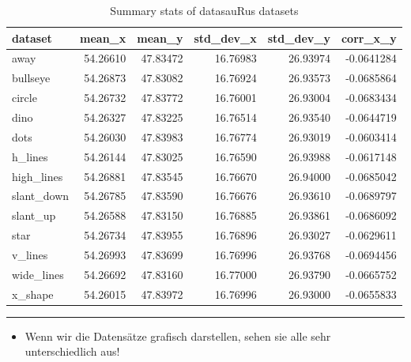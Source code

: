 \documentclass[
  letterpaper,
  DIV=11]{scrartcl}
\providecommand{\tightlist}{%
  \setlength{\itemsep}{0pt}\setlength{\parskip}{0pt}}\usepackage{longtable,booktabs,array}
\begin{document}
\hypertarget{tbl-datasauRus}{}
\begin{table}
\caption{\label{tbl-datasauRus}Summary stats of datasauRus datasets }\tabularnewline

\centering\begingroup\fontsize{20}{22}\selectfont

\begin{tabular}{l|r|r|r|r|r}
\hline
dataset & mean\_x & mean\_y & std\_dev\_x & std\_dev\_y & corr\_x\_y\\
\hline
away & 54.26610 & 47.83472 & 16.76983 & 26.93974 & -0.0641284\\
\hline
bullseye & 54.26873 & 47.83082 & 16.76924 & 26.93573 & -0.0685864\\
\hline
circle & 54.26732 & 47.83772 & 16.76001 & 26.93004 & -0.0683434\\
\hline
dino & 54.26327 & 47.83225 & 16.76514 & 26.93540 & -0.0644719\\
\hline
dots & 54.26030 & 47.83983 & 16.76774 & 26.93019 & -0.0603414\\
\hline
h\_lines & 54.26144 & 47.83025 & 16.76590 & 26.93988 & -0.0617148\\
\hline
high\_lines & 54.26881 & 47.83545 & 16.76670 & 26.94000 & -0.0685042\\
\hline
slant\_down & 54.26785 & 47.83590 & 16.76676 & 26.93610 & -0.0689797\\
\hline
slant\_up & 54.26588 & 47.83150 & 16.76885 & 26.93861 & -0.0686092\\
\hline
star & 54.26734 & 47.83955 & 16.76896 & 26.93027 & -0.0629611\\
\hline
v\_lines & 54.26993 & 47.83699 & 16.76996 & 26.93768 & -0.0694456\\
\hline
wide\_lines & 54.26692 & 47.83160 & 16.77000 & 26.93790 & -0.0665752\\
\hline
x\_shape & 54.26015 & 47.83972 & 16.76996 & 26.93000 & -0.0655833\\
\hline
\end{tabular}
\endgroup{}
\end{table}

\begin{center}\rule{0.5\linewidth}{0.5pt}\end{center}

\begin{itemize}
\tightlist
\item
  Wenn wir die Datensätze grafisch darstellen, sehen sie alle sehr
  unterschiedlich aus!
\end{itemize}
\end{document}
